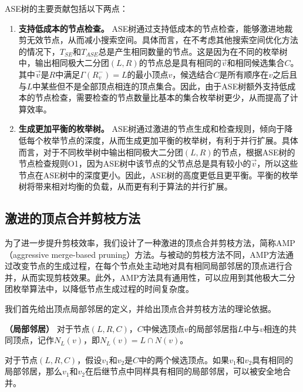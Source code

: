 ASE树的主要贡献包括以下两点：

\begin{enumerate}
  \item \textbf{支持低成本的节点检查。} ASE树通过支持低成本的节点检查，能够激进地裁剪无效节点，从而减小搜索空间。具体而言，在不考虑其他搜索空间优化方法的情况下，$T_{SE}$和$T_{ASE}$总是产生相同数量的节点。这是因为在不同的枚举树中，输出相同极大二分团$(L,R)$的节点总是具有相同的$\vec{v}$和相同候选集合$C$。其中$\vec{v}$是$R$中满足$\Gamma(R_v^-)=L$的最小顶点$v$，候选结合$C$是所有顺序在$v$之后且与$L$中某些但不是全部顶点相连的顶点集合。因此，由于ASE树额外支持低成本的节点检查，需要检查的节点数量比基本的集合枚举树更少，从而提高了计算效率。

  \item \textbf{生成更加平衡的枚举树。} ASE树通过激进的节点生成和检查规则，倾向于降低每个枚举节点的深度，从而生成更加平衡的枚举树，有利于并行扩展。具体而言，对于不同枚举树中输出相同极大二分团$(L,R)$的节点，根据ASE树的节点检查规则O1，因为ASE树中该节点的父节点总是具有较小的$\vec{v}$，所以这些节点在ASE树中的深度更小。因此，ASE树的高度更低且更平衡。平衡的枚举树将带来相对均衡的负载，从而更有利于算法的并行扩展。

\end{enumerate}

\subsection{激进的顶点合并剪枝方法}
\label{subsec:amp}


为了进一步提升剪枝效率，我们设计了一种激进的顶点合并剪枝方法，简称AMP （aggressive merge-based pruning）方法。与被动的剪枝方法不同，AMP方法通过改变节点的生成过程，在每个节点处主动地对具有相同局部邻居的顶点进行合并，从而实现剪枝效果。此外，AMP方法具有通用性，可以应用到其他极大二分团枚举算法中，以降低节点生成过程的时间复杂度。

我们首先给出顶点局部邻居的定义，并给出顶点合并剪枝方法的理论依据。

\begin{definition}
  \textbf{（局部邻居）} 对于节点$(L,R,C)$，$C$中候选顶点$v$的局部邻居指$L$中与$v$相连的共同顶点，记作$N_L(v)$，即$N_L(v) = L \cap N(v)$。
\end{definition}

\begin{theorem}
  对于节点$(L,R,C)$，假设$v_1$和$v_2$是$C$中的两个候选顶点。如果$v_1$和$v_2$具有相同的局部邻居，那么$v_1$和$v_2$在后继节点中同样具有相同的局部邻居，可以被安全地合并。
  \label{theorem:merge}
\end{theorem}

